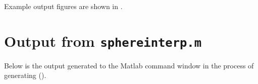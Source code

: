 \documentclass[11pt,titlepage,fleqn]{article}
\begin{document}
Example output figures are shown in .

{}




\appendix
\section{Output from {\tt sphereinterp.m}}
\label{sec:sphereinterp_out}

Below is the output generated to the Matlab command window in the process of generating  ().
\end{document}
